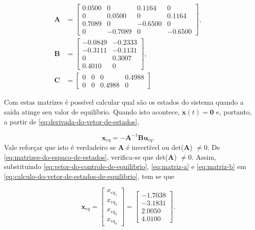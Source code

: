 \begin{subequations}
    \label{eq:matrizes-do-espaco-de-estados}
    \begin{align}
        \mathbf{A} &= 
        \begin{bmatrix}
            0.0500 &  0      &  0.1164  &  0        \\
            0      &  0.0500 &  0       &  0.1164   \\
            0.7089 &  0      & -0.6500  &  0        \\
            0      & -0.7089 &  0       & -0.6500
        \end{bmatrix},  \label{eq:matriz-a} \\
        \mathbf{B} &=
        \begin{bmatrix}
            -0.0849 & -0.2333  \\
            -0.3111 & -0.1131  \\
            0       &  0.3007  \\
            0.4010  &  0
        \end{bmatrix},  \label{eq:matriz-b} \\
        \mathbf{C} &=
        \begin{bmatrix}
            0    &    0  &      0  & 0.4988  \\
            0    &    0  & 0.4988  & 0
        \end{bmatrix}   \label{eq:matriz-c}
    \end{align}
\end{subequations}

Com estas matrizes é possível calcular qual são os estados do sistema quando a
saída atinge seu valor de equilíbrio. Quando isto acontece, $\mathbf{\dot{x}}(t)
= \mathbf{0}$ e, portanto, a partir de \ref{eq:derivada-do-vetor-de-estados},

\begin{equation}
    \label{eq:calculo-do-vetor-de-estados-de-equilibrio}
    \mathbf{x}_{eq} = -\mathbf{A}^{-1}\mathbf{B}\mathbf{u}_{eq}.
\end{equation} Vale reforçar que isto é verdadeiro se $\mathbf{A}$ é invertível
ou det($\mathbf{A}$) $\neq 0$. De \ref{eq:matrizes-do-espaco-de-estados},
verifica-se que det($\mathbf{A}$) $\neq 0$. Assim, substituindo
\ref{eq:vetor-do-controle-de-equilibrio}, \ref{eq:matriz-a} e \ref{eq:matriz-b}
em \ref{eq:calculo-do-vetor-de-estados-de-equilibrio}, tem se que

\begin{equation}
    \label{eq:estados-de-equilibrio}
    \mathbf{x}_{eq} =
    \begin{bmatrix}
        x_{eq_{1}} \\
        x_{eq_{2}} \\
        x_{eq_{3}}  \\
        x_{eq_{4}}
    \end{bmatrix}
    =
    \begin{bmatrix}
        -1.7038 \\
        -3.1831 \\
        2.0050  \\
        4.0100
    \end{bmatrix}.
\end{equation}

